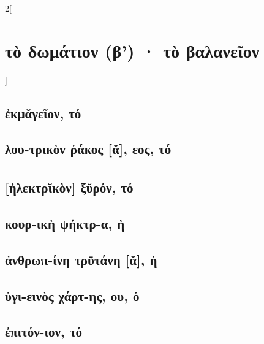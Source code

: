 \documentclass{book}
\begin{document}
\begin{multicols}{2}[\section{τὸ δωμάτιον (β') · τὸ βαλανεῖον}]
\subsection{ἐκμᾰγεῖον, τό}
\subsection{λου-τρικὸν ῥάκος [ᾰ], εος, τό}
\subsection{[ἠλεκτρῐκὸν\textsuperscript{\textdagger}] ξῠρόν, τό}
\subsection{κουρ-ικὴ ψήκτρ-α, ἡ}
\subsection{ἀνθρωπ-ίνη τρῡτάνη [ᾰ], ἡ}
\subsection{ὑγι-εινὸς χάρτ-ης, ου, ὁ}
\subsection{ἐπιτόν-ιον, τό}
~
\end{multicols}
\newpage  
\end{document}
